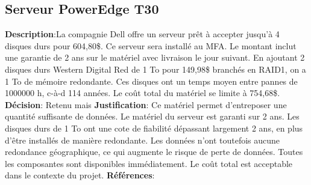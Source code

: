 

\subsection{Serveur PowerEdge T30}
\label{s:archiver_conc1}

\textbf{Description}:La compagnie Dell offre un serveur prêt à accepter jusqu’à 4 disques durs pour 604,80\$. Ce serveur sera installé au MFA. Le montant inclut une garantie de 2 ans sur le matériel avec livraison le jour suivant. En ajoutant 2 disques durs Western Digital Red de 1 To pour 149,98\$ branchés en RAID1, on a 1 To de mémoire redondante. Ces disques ont un temps moyen entre pannes de 1000000 h, c-à-d 114 années.  Le coût total du matériel se limite à 754,68\$. 
\textbf{Décision}: Retenu mais 
\textbf{Justification}: Ce matériel permet d’entreposer une quantité suffisante de données. Le matériel du serveur est garanti sur 2 ans. Les disques durs de 1 To ont une cote de fiabilité dépassant largement 2 ans, en plus d’être installés de manière redondante. Les données n’ont toutefois aucune redondance géographique, ce qui augmente le risque de perte de données. Toutes les composantes sont disponibles immédiatement. Le coût total est acceptable dans le contexte du projet.
\textbf{Références}:
\cite{dellT30, amazonWDred, wdRedSpec, wiki_raid1}


